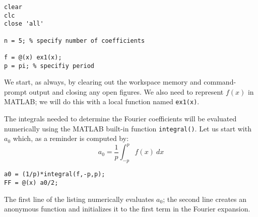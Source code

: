 \begin{lstlisting}[name=lec17-ex1]
clear
clc
close 'all'

n = 5; % specify number of coefficients

f = @(x) ex1(x); 
p = pi; % specifiy period
\end{lstlisting}
We start, as always, by clearing out the workspace memory and command-prompt output and closing any open figures.  We also need to represent $f(x)$ in MATLAB; we will do this with a local function named \lstinline{ex1(x)}.  

The integrals needed to determine the Fourier coefficients will be evaluated numerically using the MATLAB built-in function \lstinline{integral()}. Let us start with $a_0$ which, as a reminder is computed by:
\begin{equation*}
a_0 = \frac{1}{p}\int_{-p}^{p} f(x) \ dx
\end{equation*}

\begin{lstlisting}[name=lec17-ex1]
a0 = (1/p)*integral(f,-p,p);
FF = @(x) a0/2;
\end{lstlisting}
The first line of the listing numerically evaluates $a_0$; the second line creates an anonymous function and initializes it to the first term in the Fourier expansion.

